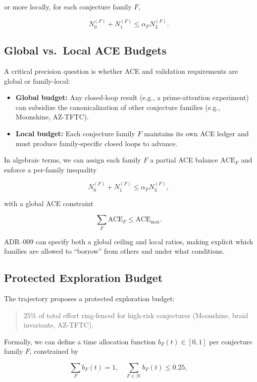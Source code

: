 \documentclass[11pt]{article}
\begin{document}
or more locally, for each conjecture family \(F\),

\[
N_0^{(F)} + N_1^{(F)} \le \alpha_F N_3^{(F)}.
\]

\subsection{Global vs.\ Local ACE Budgets}

A critical precision question is whether ACE and validation requirements are global or family-local:

\begin{itemize}[leftmargin=*]
  \item \textbf{Global budget:} Any closed-loop result (e.g., a prime-attention experiment) can subsidize the canonicalization of other conjecture families (e.g., Moonshine, AZ-TFTC).
  \item \textbf{Local budget:} Each conjecture family \(F\) maintains its own ACE ledger and must produce family-specific closed loops to advance.
\end{itemize}

In algebraic terms, we can assign each family \(F\) a partial ACE balance \(\mathrm{ACE}_F\) and enforce a per-family inequality

\[
N_0^{(F)} + N_1^{(F)} \le \alpha_F N_3^{(F)},
\]

with a global ACE constraint

\[
\sum_F \mathrm{ACE}_F \le \mathrm{ACE}_\mathrm{max}.
\]

ADR--009 can specify both a global ceiling and local ratios, making explicit which families are allowed to ``borrow'' from others and under what conditions.

\subsection{Protected Exploration Budget}

The trajectory proposes a protected exploration budget:

\begin{quote}
25\% of total effort ring-fenced for high-risk conjectures (Moonshine, braid invariants, AZ-TFTC).
\end{quote}

Formally, we can define a time allocation function \(b_F(t)\in[0,1]\) per conjecture family \(F\), constrained by

\[
\sum_F b_F(t) = 1, \quad \sum_{F\in \mathcal{H}} b_F(t) \le 0.25,
\]
\end{document}
